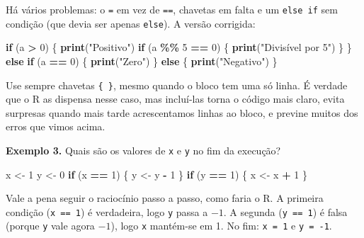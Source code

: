 \documentclass[
  portuguese,
  11pt,
  openany]{book}
\newenvironment{Shaded}{\begin{snugshade}}{\end{snugshade}}
\newcommand{\ControlFlowTok}[1]{\textcolor[rgb]{0.13,0.29,0.53}{\textbf{#1}}}
\newcommand{\DecValTok}[1]{\textcolor[rgb]{0.00,0.00,0.81}{#1}}
\newcommand{\FunctionTok}[1]{\textcolor[rgb]{0.13,0.29,0.53}{\textbf{#1}}}
\newcommand{\NormalTok}[1]{#1}
\newcommand{\OtherTok}[1]{\textcolor[rgb]{0.56,0.35,0.01}{#1}}
\newcommand{\SpecialCharTok}[1]{\textcolor[rgb]{0.81,0.36,0.00}{\textbf{#1}}}
\newcommand{\StringTok}[1]{\textcolor[rgb]{0.31,0.60,0.02}{#1}}
\begin{document}
Há vários problemas: o \texttt{=} em vez de \texttt{==}, chavetas em falta e um \texttt{else\ if} sem
condição (que devia ser apenas \texttt{else}). A versão corrigida:

\begin{Shaded}
\begin{Highlighting}[]
\ControlFlowTok{if}\NormalTok{ (a }\SpecialCharTok{\textgreater{}} \DecValTok{0}\NormalTok{) \{}
  \FunctionTok{print}\NormalTok{(}\StringTok{"Positivo"}\NormalTok{)}
  \ControlFlowTok{if}\NormalTok{ (a }\SpecialCharTok{\%\%} \DecValTok{5} \SpecialCharTok{==} \DecValTok{0}\NormalTok{) \{}
    \FunctionTok{print}\NormalTok{(}\StringTok{"Divisível por 5"}\NormalTok{)}
\NormalTok{  \}}
\NormalTok{\} }\ControlFlowTok{else} \ControlFlowTok{if}\NormalTok{ (a }\SpecialCharTok{==} \DecValTok{0}\NormalTok{) \{}
  \FunctionTok{print}\NormalTok{(}\StringTok{"Zero"}\NormalTok{)}
\NormalTok{\} }\ControlFlowTok{else}\NormalTok{ \{}
  \FunctionTok{print}\NormalTok{(}\StringTok{"Negativo"}\NormalTok{)}
\NormalTok{\}}
\end{Highlighting}
\end{Shaded}

Use sempre chavetas \texttt{\{\ \}}, mesmo quando o bloco tem uma só linha. É verdade que o
R as dispensa nesse caso, mas incluí-las torna o código mais claro, evita
surpresas quando mais tarde acrescentamos linhas ao bloco, e previne muitos dos
erros que vimos acima.

\textbf{Exemplo 3.} Quais são os valores de \texttt{x} e \texttt{y} no fim da execução?

\begin{Shaded}
\begin{Highlighting}[]
\NormalTok{x }\OtherTok{\textless{}{-}} \DecValTok{1}
\NormalTok{y }\OtherTok{\textless{}{-}} \DecValTok{0}
\ControlFlowTok{if}\NormalTok{ (x }\SpecialCharTok{==} \DecValTok{1}\NormalTok{) \{}
\NormalTok{  y }\OtherTok{\textless{}{-}}\NormalTok{ y }\SpecialCharTok{{-}} \DecValTok{1}
\NormalTok{\}}
\ControlFlowTok{if}\NormalTok{ (y }\SpecialCharTok{==} \DecValTok{1}\NormalTok{) \{}
\NormalTok{  x }\OtherTok{\textless{}{-}}\NormalTok{ x }\SpecialCharTok{+} \DecValTok{1}
\NormalTok{\}}
\end{Highlighting}
\end{Shaded}

Vale a pena seguir o raciocínio passo a passo, como faria o R. A primeira condição
(\texttt{x\ ==\ 1}) é verdadeira, logo \texttt{y} passa a \(-1\). A segunda (\texttt{y\ ==\ 1}) é falsa
(porque \texttt{y} vale agora \(-1\)), logo \texttt{x} mantém-se em 1. No fim: \texttt{x\ =\ 1} e \texttt{y\ =\ -1}.
\end{document}
